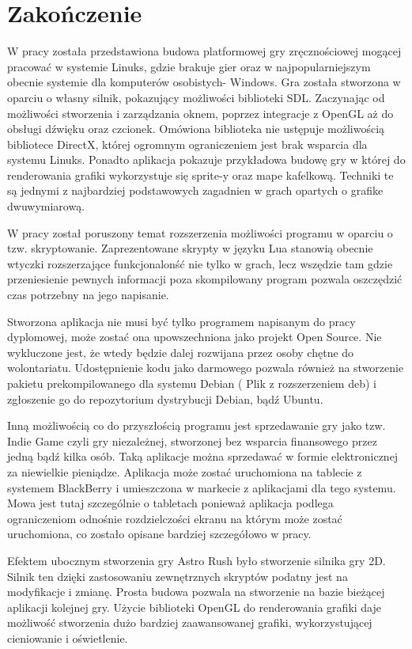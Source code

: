 \setcounter{secnumdepth}{-1}
\renewcommand{\chaptername}{}
\chapter{Zakończenie} 
\hspace{1cm} W pracy została przedstawiona budowa platformowej gry zręcznościowej mogącej pracować w systemie Linuks, gdzie brakuje gier oraz w najpopularniejszym obecnie systemie dla komputerów osobistych- Windows. 
Gra została stworzona w oparciu o własny silnik, pokazujący możliwości biblioteki SDL. Zaczynając od możliwości stworzenia i zarządzania oknem, poprzez integracje z OpenGL aż do obsługi dźwięku oraz czcionek. Omówiona biblioteka nie ustępuje możliwością bibliotece DirectX, której ogromnym ograniczeniem jest brak wsparcia dla systemu Linuks. Ponadto aplikacja pokazuje przykładowa budowę gry w której do renderowania grafiki wykorzystuje się sprite-y oraz mape kafelkową. Techniki te są jednymi z najbardziej podstawowych zagadnien w grach opartych o grafike dwuwymiarową.

W pracy został poruszony temat rozszerzenia możliwości programu w oparciu o tzw. skryptowanie. Zaprezentowane skrypty w języku Lua stanowią obecnie wtyczki rozszerzające funkcjonalonść nie tylko w grach, lecz wszędzie tam gdzie przeniesienie pewnych informacji poza skompilowany program pozwala oszczędzić czas potrzebny na jego napisanie.  

Stworzona aplikacja nie musi być tylko programem napisanym do pracy dyplomowej, może zostać ona upowszechniona jako projekt Open Source. Nie wykluczone jest, że wtedy będzie dalej rozwijana przez osoby chętne do wolontariatu. Udostępnienie kodu jako darmowego pozwala również na stworzenie pakietu prekompilowanego dla systemu Debian ( Plik z rozszerzeniem deb) i zgłoszenie go do repozytorium dystrybucji Debian, bądź Ubuntu. 

Inną możliwością co do przyszłością programu jest sprzedawanie gry jako tzw. Indie Game czyli gry niezależnej, stworzonej bez wsparcia finansowego przez jedną bądź kilka osób. Taką aplikacje można sprzedawać w formie elektronicznej za niewielkie pieniądze. Aplikacja może zostać uruchomiona na tablecie z systemem BlackBerry i umieszczona w markecie z aplikacjami dla tego systemu. Mowa jest tutaj szczególnie o tabletach ponieważ aplikacja podlega ograniczeniom odnośnie rozdzielczości ekranu na którym może zostać uruchomiona, co zostało opisane bardziej szczegółowo w pracy.  

Efektem ubocznym stworzenia gry Astro Rush było stworzenie silnika gry 2D. Silnik ten dzięki zastosowaniu zewnętrznych skryptów podatny jest na modyfikacje i zmianę. Prosta budowa pozwala na stworzenie na bazie bieżącej aplikacji kolejnej gry. Użycie biblioteki OpenGL do renderowania grafiki daje możliwość stworzenia dużo bardziej zaawansowanej grafiki, wykorzystującej cieniowanie i oświetlenie. 


